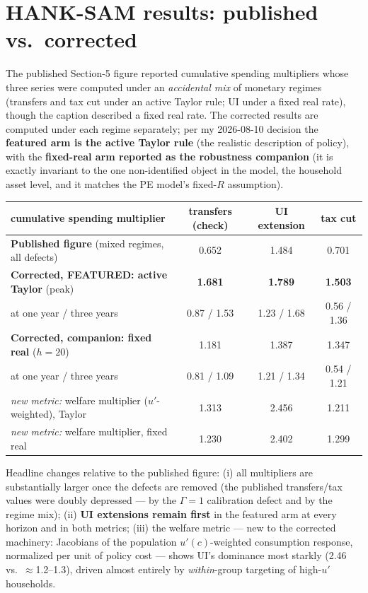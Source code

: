 \documentclass[11pt]{article}
\begin{document}
\section{HANK-SAM results: published vs.\ corrected}
\label{sec:hank}

The published Section-5 figure reported cumulative spending multipliers
whose three series were computed under an \emph{accidental mix} of
monetary regimes (transfers and tax cut under an active Taylor rule; UI
under a fixed real rate), though the caption described a fixed real
rate. The corrected results are computed under each regime separately;
per my 2026-08-10 decision the \textbf{featured arm is the
active Taylor rule} (the realistic description of policy), with the
\textbf{fixed-real arm reported as the robustness companion} (it is
exactly invariant to the one non-identified object in the model, the
household asset level, and it matches the PE model's fixed-$R$
assumption).

\begin{center}\small
\begin{tabular}{@{}lccc@{}}
\toprule
cumulative spending multiplier & transfers (check) & UI extension & tax cut \\
\midrule
\textbf{Published figure} (mixed regimes, all defects) & 0.652 & 1.484 & 0.701 \\
\midrule
\textbf{Corrected, FEATURED: active Taylor} (peak) & \textbf{1.681} & \textbf{1.789} & \textbf{1.503} \\
\quad at one year / three years & 0.87 / 1.53 & 1.23 / 1.68 & 0.56 / 1.36 \\
\textbf{Corrected, companion: fixed real} ($h{=}20$) & 1.181 & 1.387 & 1.347 \\
\quad at one year / three years & 0.81 / 1.09 & 1.21 / 1.34 & 0.54 / 1.21 \\
\midrule
\emph{new metric:} welfare multiplier ($u'$-weighted), Taylor & 1.313 & 2.456 & 1.211 \\
\emph{new metric:} welfare multiplier, fixed real & 1.230 & 2.402 & 1.299 \\
\bottomrule
\end{tabular}
\end{center}

Headline changes relative to the published figure: (i) all multipliers
are substantially larger once the defects are removed (the published
transfers/tax values were doubly depressed --- by the $\Gamma=1$
calibration defect and by the regime mix); (ii) \textbf{UI extensions
remain first} in the featured arm at every horizon and in both metrics;
(iii) the welfare metric --- new to the corrected machinery: Jacobians
of the population $u'(c)$-weighted consumption response, normalized per
unit of policy cost --- shows UI's dominance most starkly (2.46 vs.\
$\approx$1.2--1.3), driven almost entirely by \emph{within}-group
targeting of high-$u'$ households.
\end{document}
